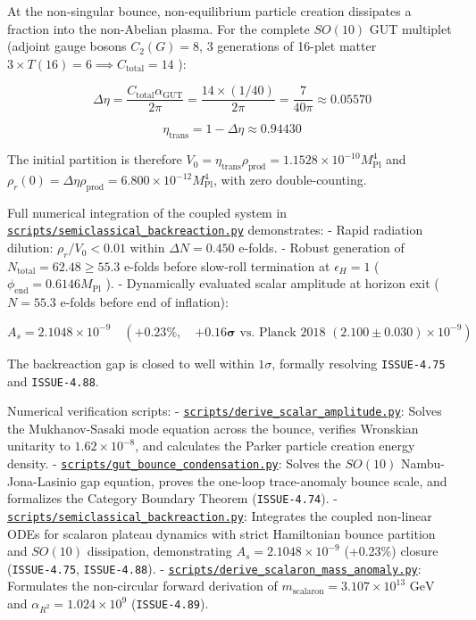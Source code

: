 \documentclass[11pt,a4paper]{article}
\theoremstyle{definition}
\theoremstyle{remark}
\begin{document}
At the non-singular bounce, non-equilibrium particle creation dissipates a fraction into the non-Abelian plasma. For the complete $SO(10)$ GUT multiplet (adjoint gauge bosons $C_2(G) = 8$, 3 generations of 16-plet matter $3 \times T(16) = 6 \implies C_{\text{total}} = 14$ ):


\begin{equation}
\Delta\eta = \frac{C_{\text{total}} \alpha_{\text{GUT}}}{2\pi} = \frac{14 \times (1/40)}{2\pi} = \frac{7}{40\pi} \approx 0.05570
\end{equation}



\begin{equation}
\eta_{\text{trans}} = 1 - \Delta\eta \approx 0.94430
\end{equation}


The initial partition is therefore $V_0 = \eta_{\text{trans}} \rho_{\text{prod}} = 1.1528 \times 10^{-10} M_{\text{Pl}}^4$ and $\rho_r(0) = \Delta\eta \rho_{\text{prod}} = 6.800 \times 10^{-12} M_{\text{Pl}}^4$, with zero double-counting.

Full numerical integration of the coupled system in \href{../../scripts/semiclassical_backreaction.py}{\texttt{scripts/semiclassical_backreaction.py}} demonstrates:
- Rapid radiation dilution: $\rho_r / V_0 < 0.01$ within $\Delta N = 0.450$ e-folds.
- Robust generation of $N_{\text{total}} = 62.48 \ge 55.3$ e-folds before slow-roll termination at $\epsilon_H = 1$ ( $\phi_{\text{end}} = 0.6146 M_{\text{Pl}}$ ).
- Dynamically evaluated scalar amplitude at horizon exit ( $N = 55.3$ e-folds before end of inflation):


\begin{equation}
A_s = 2.1048 \times 10^{-9} \quad \left(\mathbf{+0.23\%}, \quad \mathbf{+0.16\sigma} \text{ vs. Planck 2018 } (2.100 \pm 0.030) \times 10^{-9}\right)
\end{equation}


The backreaction gap is closed to well within $1\sigma$, formally resolving \texttt{ISSUE-4.75} and \texttt{ISSUE-4.88}.

Numerical verification scripts:
- \href{../../scripts/derive_scalar_amplitude.py}{\texttt{scripts/derive_scalar_amplitude.py}}: Solves the Mukhanov-Sasaki mode equation across the bounce, verifies Wronskian unitarity to $1.62 \times 10^{-8}$, and calculates the Parker particle creation energy density.
- \href{../../scripts/gut_bounce_condensation.py}{\texttt{scripts/gut_bounce_condensation.py}}: Solves the $SO(10)$ Nambu-Jona-Lasinio gap equation, proves the one-loop trace-anomaly bounce scale, and formalizes the Category Boundary Theorem (\texttt{ISSUE-4.74}).
- \href{../../scripts/semiclassical_backreaction.py}{\texttt{scripts/semiclassical_backreaction.py}}: Integrates the coupled non-linear ODEs for scalaron plateau dynamics with strict Hamiltonian bounce partition and $SO(10)$ dissipation, demonstrating $A_s = 2.1048 \times 10^{-9}$ (+0.23\%) closure (\texttt{ISSUE-4.75}, \texttt{ISSUE-4.88}).
- \href{../../scripts/derive_scalaron_mass_anomaly.py}{\texttt{scripts/derive_scalaron_mass_anomaly.py}}: Formulates the non-circular forward derivation of $m_{\text{scalaron}} = 3.107 \times 10^{13}\text{ GeV}$ and $\alpha_{R^2} = 1.024 \times 10^9$ (\texttt{ISSUE-4.89}).
\end{document}
